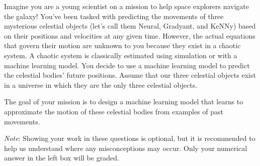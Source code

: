 \documentclass[11pt,addpoints,answers]{exam}
\newcommand{\Xc}{\mathcal{X}}
\begin{document}
\begin{questions}
Imagine you are a young scientist on a mission to help space explorers navigate the galaxy! You've been tasked with predicting the movements of three mysterious celestial objects (let's call them Neural, Gradyant, and KeNNy) based on their positions and velocities at any given time. However, the actual equations that govern their motion are unknown to you because they exist in a chaotic system. A chaotic system is classically estimated using simulation or with a machine learning model. You decide to use a machine learning model to predict the celestial bodies' future positions. Assume that our three celestial objects exist in a universe in which they are the only three celestial objects.

The goal of your mission is to design a machine learning model that learns to approximate the motion of these celestial bodies from examples of past movements.

\textit{Note}: Showing your work in these questions is optional, but it is recommended to help us understand where any misconceptions may occur. Only your numerical answer in the left box will be graded. \\
    
\end{questions}
\end{document}
